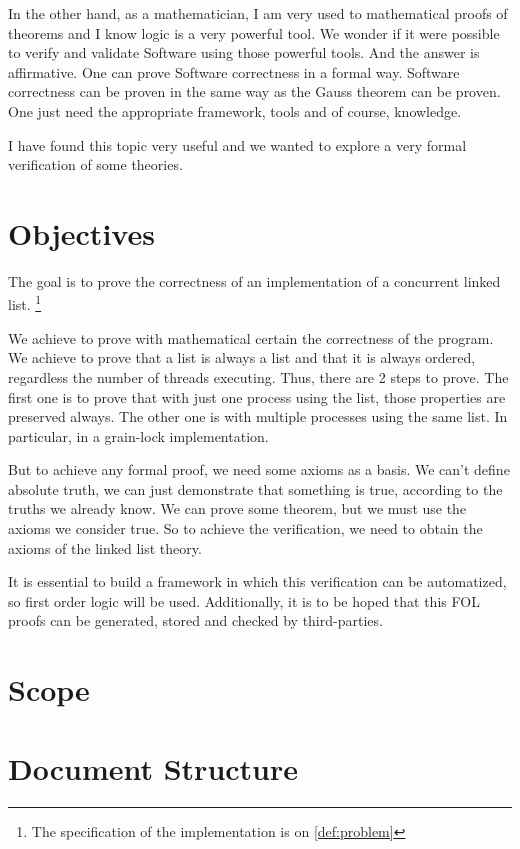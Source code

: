 In the other hand, as a mathematician, I am very used to mathematical proofs of theorems and I know logic is a very powerful tool.
%
We wonder if it were possible to verify and validate Software using those powerful tools.
%
And the answer is affirmative.
%
One can prove Software correctness in a formal way.
% 
Software correctness can be proven in the same way as the Gauss theorem can be proven.
%
One just need the appropriate framework, tools and of course, knowledge.


I have found this topic very useful and we wanted to explore a very formal verification of some theories.


\section{Objectives}

The goal is to prove the correctness of an implementation of a concurrent linked list. \footnote{The specification of the implementation is on \ref{def:problem}}

We achieve to prove with mathematical certain the correctness of the program. 
%
We achieve to prove that a list is always a list and that it is always ordered, regardless the number of threads executing.
%
Thus, there are 2 steps to prove. 
%
The first one is to prove that with just one process using the list, those properties are preserved always. 
%
The other one is with multiple processes using the same list. 
%
In particular, in a grain-lock implementation.

But to achieve any formal proof, we need some axioms as a basis.
%
We can't define absolute truth, we can just demonstrate that something is true, according to the truths we already know. 
%
We can prove some theorem, but we must use the axioms we consider true. 
%
So to achieve the verification, we need to obtain the axioms of the linked list theory.

It is essential to build a framework in which this verification can be automatized, so first order logic will be used. 
%
Additionally, it is to be hoped that this \gls{FOL} proofs can be generated, stored and checked by third-parties.


\section{Scope}

\label{def:leap}


\section{Document Structure}

